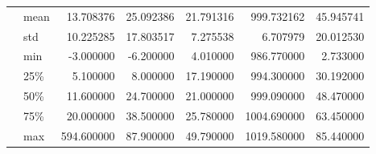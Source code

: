 \begin{tabular}{llrrrrr}
  & mean &      13.708376 &      25.092386 &      21.791316 &     999.732162 &      45.945741 \\
  & std &      10.225285 &      17.803517 &       7.275538 &       6.707979 &      20.012530 \\
  & min &      -3.000000 &      -6.200000 &       4.010000 &     986.770000 &       2.733000 \\
  & 25\% &       5.100000 &       8.000000 &      17.190000 &     994.300000 &      30.192000 \\
  & 50\% &      11.600000 &      24.700000 &      21.000000 &     999.090000 &      48.470000 \\
  & 75\% &      20.000000 &      38.500000 &      25.780000 &    1004.690000 &      63.450000 \\
  & max &     594.600000 &      87.900000 &      49.790000 &    1019.580000 &      85.440000 \\
\bottomrule
\end{tabular}
